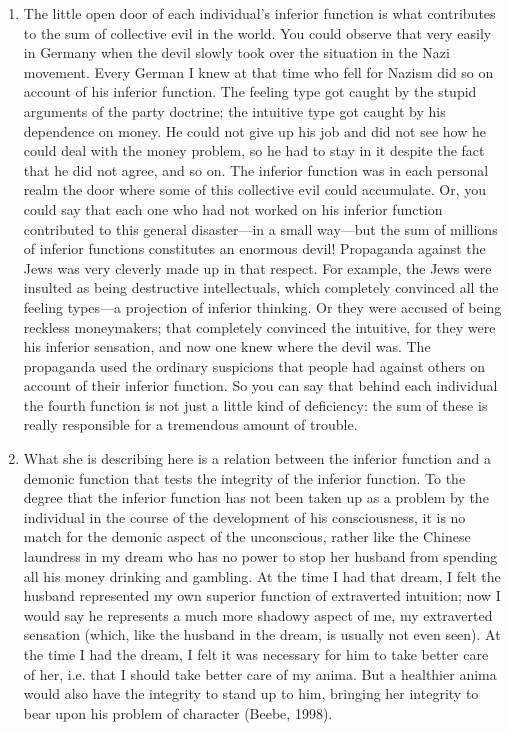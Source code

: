 \begin{enumerate}
    \item {} The little open door of each individual's inferior function
        is what contributes to the sum of collective evil in the world. You
        could observe that very easily in Germany when the devil slowly took
        over the situation in the Nazi movement. Every German I knew at that
        time who fell for Nazism did so on account of his inferior function.
        The feeling type got caught by the stupid arguments of the party
        doctrine; the intuitive type got caught by his dependence on money. He
        could not give up his job and did not see how he could deal with the
        money problem, so he had to stay in it despite the fact that he did not
        agree, and so on. The inferior function was in each personal realm the
        door where some of this collective evil could accumulate. Or, you could
        say that each one who had not worked on his inferior function
        contributed to this general disaster—in a small way—but the sum of
        millions of inferior functions constitutes an enormous devil!
        Propaganda against the Jews was very cleverly made up in that respect.
        For example, the Jews were insulted as being destructive intellectuals,
        which completely convinced all the feeling types—a projection of
        inferior thinking. Or they were accused of being reckless moneymakers;
        that completely convinced the intuitive, for they were his inferior
        sensation, and now one knew where the devil was. The propaganda used
        the ordinary suspicions that people had against others on account of
        their inferior function. So you can say that behind each individual the
        fourth function is not just a little kind of deficiency: the sum of
        these is really responsible for a tremendous amount of trouble.

    \item {} What she is describing here is a
        relation between the inferior function and a demonic function that
        tests the integrity of the inferior function. To the degree that the
        inferior function has not been taken up as a problem by the individual
        in the course of the development of his consciousness, it is no match
        for the demonic aspect of the unconscious, rather like the Chinese
        laundress in my dream who has no power to stop her husband from
        spending all his money drinking and gambling. At the time I had that
        dream, I felt the husband represented my own superior function of
        extraverted intuition; now I would say he represents a much more
        shadowy aspect of me, my extraverted sensation (which, like the husband
        in the dream, is usually not even seen). At the time I had the dream, I
        felt it was necessary for him to take better care of her, i.e. that I
        should take better care of my anima. But a healthier anima would also
        have the integrity to stand up to him, bringing her integrity to bear
        upon his problem of character (Beebe, 1998).


\end{enumerate}

